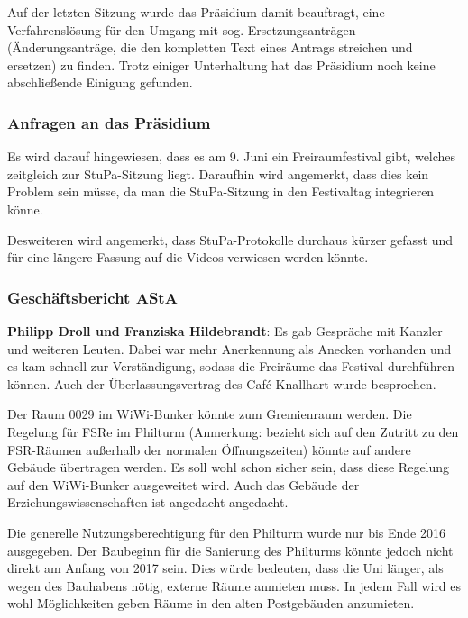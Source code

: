 \documentclass[ngerman,headheight=70pt]{scrartcl}
\begin{document}
    Auf der letzten Sitzung wurde das Präsidium damit beauftragt, eine Verfahrenslösung
    für den Umgang mit sog. Ersetzungsanträgen (Änderungsanträge, die den kompletten
    Text eines Antrags streichen und ersetzen) zu finden. Trotz einiger Unterhaltung
    hat das Präsidium noch keine abschließende Einigung gefunden.

    \subsubsection{Anfragen an das Präsidium}

    Es wird darauf hingewiesen, dass es am 9. Juni ein Freiraumfestival gibt,
    welches zeitgleich zur StuPa-Sitzung liegt. Daraufhin wird angemerkt,
    dass dies kein Problem sein müsse, da man die StuPa-Sitzung in den
    Festivaltag integrieren könne.

    Desweiteren wird angemerkt, dass StuPa-Protokolle durchaus kürzer gefasst
    und für eine längere Fassung auf die Videos verwiesen werden könnte.

    \subsubsection{Geschäftsbericht AStA}

    \textbf{Philipp Droll und Franziska Hildebrandt}: Es gab Gespräche mit
    Kanzler und weiteren Leuten. Dabei war mehr Anerkennung als Anecken vorhanden
    und es kam schnell zur Verständigung, sodass die Freiräume das Festival
    durchführen können. Auch der Überlassungsvertrag des Café Knallhart wurde
    besprochen.

    Der Raum 0029 im WiWi-Bunker könnte zum Gremienraum werden. Die Regelung für
    FSRe im Philturm (Anmerkung: bezieht sich auf den Zutritt zu den FSR-Räumen
    außerhalb der normalen Öffnungszeiten) könnte auf andere Gebäude übertragen
    werden. Es soll wohl schon sicher sein, dass diese Regelung auf den WiWi-Bunker
    ausgeweitet wird. Auch das Gebäude der Erziehungswissenschaften ist
    angedacht angedacht.

    Die generelle Nutzungsberechtigung für den Philturm wurde nur bis Ende 2016
    ausgegeben. Der Baubeginn für die Sanierung des Philturms könnte jedoch nicht
    direkt am Anfang von 2017 sein. Dies würde bedeuten, dass die Uni länger, als
    wegen des Bauhabens nötig, externe Räume anmieten muss. In jedem Fall wird es
    wohl Möglichkeiten geben Räume in den alten Postgebäuden anzumieten.
\end{document}

